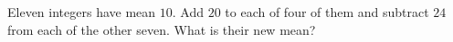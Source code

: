 Eleven integers have mean $10$. Add $20$ to each of four of them and subtract $24$ from each of the other seven. What is their new mean?

